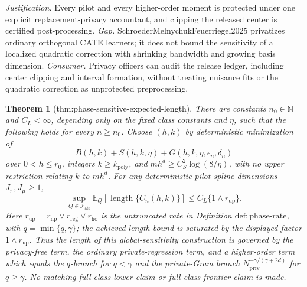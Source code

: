 \documentclass{article}
\newtheorem{theorem}{Theorem}
\begin{document}
\par\smallskip\noindent \textit{Justification.} Every pilot and every higher-order moment is protected under one explicit replacement-privacy accountant, and clipping the released center is certified post-processing. \textit{Gap.} SchroederMelnychukFeuerriegel2025 privatizes ordinary orthogonal CATE learners; it does not bound the sensitivity of a localized quadratic correction with shrinking bandwidth and growing basis dimension. \textit{Consumer.} Privacy officers can audit the release ledger, including center clipping and interval formation, without treating nuisance fits or the quadratic correction as unprotected preprocessing.

\begin{theorem}[thm:phase-sensitive-expected-length]\label{thm:phase-sensitive-expected-length}
There are constants \(n_0\in\mathbb N\) and \(C_L<\infty\), depending only on the fixed class constants and \(\eta\), such that the following holds for every \(n\ge n_0\). Choose \((h,k)\) by deterministic minimization of
\[
 B(h,k)+S(h,k,\eta)+G(h,k,\eta,\epsilon_n,\delta_n)
\]
over \(0<h\le r_0\), integers \(k\ge k_{\mathrm{poly}}\), and \(m h^d\ge C_S^2\log(8/\eta)\), with no upper restriction relating \(k\) to \(m h^d\). For any deterministic pilot spline dimensions \(J_\pi,J_\mu\ge1\),
\[
 \sup_{Q\in\mathcal P_{\mathrm{att}}}
 \mathbb E_Q[\operatorname{length}\{C_n(h,k)\}]
 \le C_L\{1\wedge r_{\mathrm{up}}\}.
\]
Here \(r_{\mathrm{up}}=r_{\mathrm{np}}\vee r_{\mathrm{reg}}\vee r_{\mathrm{ho}}\) is the untruncated rate in Definition \(\mathrm{def{:}phase\text{-}rate}\), with \(\bar q=\min\{q,\gamma\}\); the achieved length bound is saturated by the displayed factor \(1\wedge r_{\mathrm{up}}\). Thus the length of this global-sensitivity construction is governed by the privacy-free term, the ordinary private-regression term, and a higher-order term which equals the \(q\)-branch for \(q<\gamma\) and the private-Gram branch \(N_{\mathrm{priv}}^{-\gamma/(\gamma+2d)}\) for \(q\ge\gamma\). No matching full-class lower claim or full-class frontier claim is made.
\end{theorem}
\end{document}
